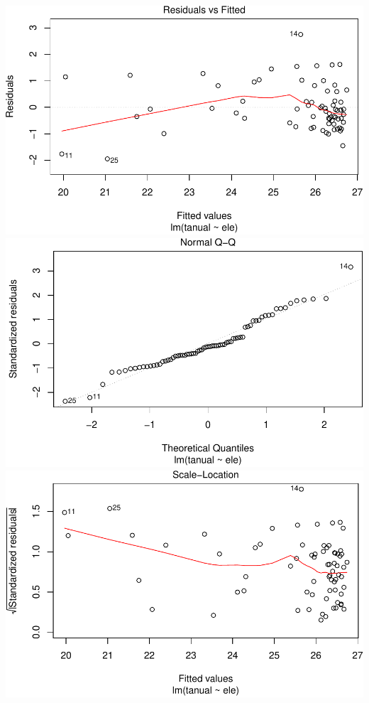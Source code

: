 \documentclass[11pt,]{article}
\begin{document}
\includegraphics[width=600px]{proyecto_files/figure-latex/agregar-y-modelo-2}
\includegraphics[width=600px]{proyecto_files/figure-latex/agregar-y-modelo-3}
\includegraphics[width=600px]{proyecto_files/figure-latex/agregar-y-modelo-4}
\end{document}
